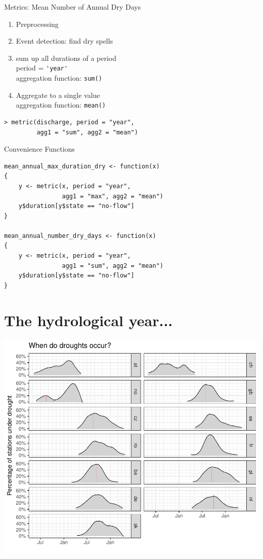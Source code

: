 \documentclass[xetex, german]{beamer}
\begin{document}
\begin{frame}[fragile]{Metrics: Mean Number of Annual Dry Days}
	
	\begin{enumerate}
		\item Preprocessing 
		\item Event detection: find dry spells\\
		
		\item sum up all durations of a period\\
		period = \verb|'year'|\\
		aggregation function: \verb|sum()|
		\item Aggregate to a single value\\
		aggregation function: \verb|mean()|
	\end{enumerate}
	\begin{verbatim}
> metric(discharge, period = "year",
         agg1 = "sum", agg2 = "mean")
\end{verbatim}
\end{frame}

\begin{frame}[fragile]{Convenience Functions}

\begin{verbatim}
mean_annual_max_duration_dry <- function(x)
{
    y <- metric(x, period = "year", 
                agg1 = "max", agg2 = "mean")
    y$duration[y$state == "no-flow"]
}

mean_annual_number_dry_days <- function(x)
{
    y <- metric(x, period = "year", 
                agg1 = "sum", agg2 = "mean")
    y$duration[y$state == "no-flow"]
}
\end{verbatim}

\end{frame}

\section{The hydrological year...}

\begin{frame}
	\includegraphics[height=\textheight]{./fig/hyear_start.pdf}   
\end{frame}
\end{document}
